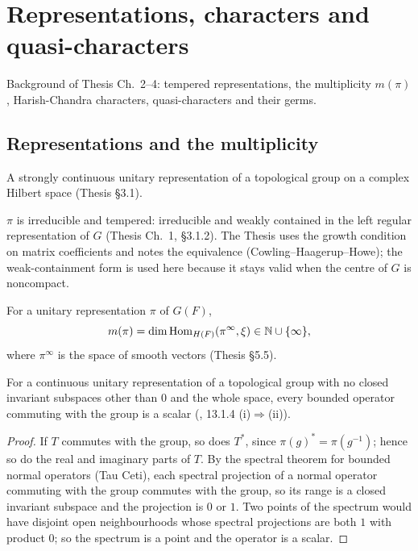 \chapter{Representations, characters and quasi-characters}
\label{chap:reps}
Background of Thesis Ch.~2--4: tempered representations, the multiplicity $m(\pi)$,
Harish-Chandra characters, quasi-characters and their germs.

\section{Representations and the multiplicity}
\begin{definition}
\label{UnitaryRep}
\leanok
A strongly continuous unitary representation of a topological group on a complex Hilbert space
(Thesis \S3.1).
\end{definition}

\begin{definition}
\label{IsTempered}
\leanok
{}
$\pi$ is irreducible and tempered: irreducible and weakly contained in the left regular representation
of $G$ (Thesis Ch.~1, \S3.1.2). The Thesis uses the growth condition on matrix coefficients and notes the
equivalence (Cowling--Haagerup--Howe); the weak-containment form is used here because it stays valid
when the centre of $G$ is noncompact.
\end{definition}

\begin{definition}
\label{mult}
\leanok
{}
For a unitary representation $\pi$ of $G(F)$, \[ m(\pi)=\dim\mathrm{Hom}_{H(F)}(\pi^\infty,\xi)\in\mathbb N\cup\{\infty\}, \]
where $\pi^\infty$ is the space of smooth vectors (Thesis \S5.5).
\end{definition}

\begin{theorem}
\label{dixmier_commutant_scalar}
\leanok
{}
For a continuous unitary representation of a topological group with no closed invariant subspaces other than $0$ and the
whole space, every bounded operator commuting with the group is a scalar (\cite{Dixmier}, 13.1.4 (i)$\Rightarrow$(ii)).
\end{theorem}
\begin{proof}
\leanok
If $T$ commutes with the group, so does $T^*$, since $\pi(g)^*=\pi(g^{-1})$; hence so do the real and imaginary parts
of $T$. By the spectral theorem for bounded normal operators (Tau Ceti), each spectral projection of a normal operator
commuting with the group commutes with the group, so its range is a closed invariant subspace and the projection is $0$
or $1$. Two points of the spectrum would have disjoint open neighbourhoods whose spectral projections are both $1$ with
product $0$; so the spectrum is a point and the operator is a scalar.
\end{proof}

